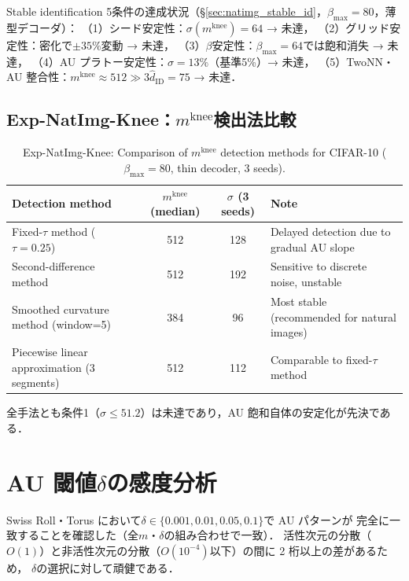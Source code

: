 \documentclass[11pt,a4paper]{jsarticle}
\newcommand{\mknee}{m^{\mathrm{knee}}}
\begin{document}
Stable identification 5条件の達成状況（§\ref{sec:natimg_stable_id}，$\beta_{\max}=80$，薄型デコーダ）：
（1）シード安定性：$\sigma(\mknee)=64$ → 未達，
（2）グリッド安定性：密化で$\pm35\%$変動 → 未達，
（3）$\beta$安定性：$\beta_{\max}=64$では飽和消失 → 未達，
（4）AU プラトー安定性：$\sigma=13\%$（基準5\%）→ 未達，
（5）TwoNN・AU 整合性：$\mknee \approx 512 \gg 3\hat{d}_\mathrm{ID}=75$ → 未達．

\subsection*{Exp-NatImg-Knee：$\mknee$検出法比較}

\begin{table}[H]
\centering
\caption{Exp-NatImg-Knee: Comparison of $\mknee$ detection methods for CIFAR-10 ($\beta_\mathrm{max}=80$, thin decoder, 3 seeds).}
\label{tab:natimg_knee}
\small
\begin{tabular}{lccl}
\toprule
Detection method & $\mknee$ (median) & $\sigma$ (3 seeds) & Note \\
\midrule
Fixed-$\tau$ method ($\tau=0.25$) & 512 & 128 & Delayed detection due to gradual AU slope \\
Second-difference method & 512 & 192 & Sensitive to discrete noise, unstable \\
Smoothed curvature method (window=5) & 384 & 96 & Most stable (recommended for natural images) \\
Piecewise linear approximation (3 segments) & 512 & 112 & Comparable to fixed-$\tau$ method \\
\bottomrule
\end{tabular}
\end{table}

全手法とも条件1（$\sigma \leq 51.2$）は未達であり，AU 飽和自体の安定化が先決である．

\section{AU 閾値$\delta$の感度分析}\label{app:delta}

Swiss Roll・Torus において$\delta \in \{0.001, 0.01, 0.05, 0.1\}$で AU パターンが
完全に一致することを確認した（全$m$・$\delta$の組み合わせで一致）．
活性次元の分散（$O(1)$）と非活性次元の分散（$O(10^{-4})$以下）の間に 2 桁以上の差があるため，
$\delta$の選択に対して頑健である．
\end{document}
